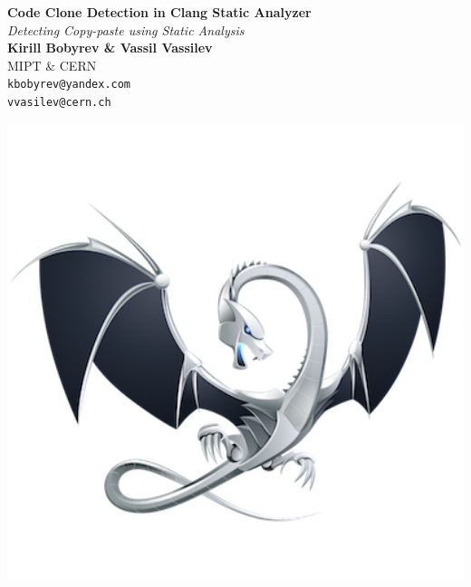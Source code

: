 \documentclass[a0,portrait]{a0poster}
\begin{document}

\begin{minipage}[b]{0.75\linewidth}
\veryHuge \textbf{Code Clone Detection in Clang Static Analyzer} \color{Black}\\ %
\Huge\textit{Detecting Copy-paste using Static Analysis}\\[2cm] %
\huge \textbf{Kirill Bobyrev \& Vassil Vassilev}\\[0.5cm] %
\huge MIPT \& CERN\\[0.4cm] %
\Large \texttt{kbobyrev@yandex.com}\\
\Large \texttt{vvasilev@cern.ch}\\
\end{minipage}
%
\begin{minipage}[b]{0.25\linewidth}
\includegraphics[width=20cm]{logo.png}\\
\end{minipage}

\vspace{1cm} %
\end{document}
